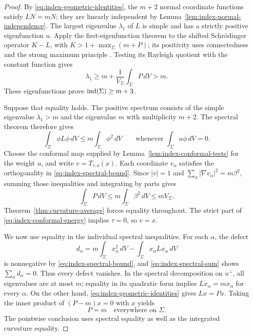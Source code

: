 \begin{proof}
By \eqref{eq:index-geometric-identities}, the $m+2$ normal coordinate
functions satisfy $LN=mN$; they are linearly independent by
Lemma~\ref{lem:index-normal-independence}.  The largest eigenvalue
$\lambda_1$ of $L$ is simple and has a strictly positive eigenfunction
$u$. Apply the first-eigenfunction theorem to the shifted Schr\"odinger
operator $K-L$, with $K>1+\max_\Sigma(m+P)$; its positivity uses
connectedness and the strong maximum principle
\cite[Proposition~2.9]{TaylorSpectralNotes}. Testing its Rayleigh quotient with
the constant function gives
\[
 \lambda_1\ge m+\frac{1}{V_\Sigma}\int_\Sigma P\,dV>m.
\]
These eigenfunctions prove $\operatorname{ind}(\Sigma)\ge m+3$.

Suppose that equality holds.  The positive spectrum consists of the
simple eigenvalue $\lambda_1>m$ and the eigenvalue $m$ with multiplicity
$m+2$.  The spectral theorem therefore gives
\begin{equation}\label{eq:index-spectral-bound}
 \int_\Sigma\phi L\phi\,dV\le m\int_\Sigma\phi^2\,dV
 \qquad\text{whenever }\int_\Sigma u\phi\,dV=0.
\end{equation}
Choose the conformal map supplied by
Lemma~\ref{lem:index-conformal-tests} for the weight $u$, and write
$v=T_{\tau,a}(x)$.  Each coordinate $v_\alpha$ satisfies the
orthogonality in \eqref{eq:index-spectral-bound}.  Since $|v|=1$ and
$\sum_\alpha|\nabla v_\alpha|^2=m\beta^2$, summing those inequalities
and integrating by parts gives
\begin{equation}\label{eq:index-spectral-sum}
 \int_\Sigma P\,dV
       \le m\int_\Sigma\beta^2\,dV\le mV_\Sigma.
\end{equation}
Theorem~\ref{thm:curvature-average} forces equality throughout.  The
strict part of \eqref{eq:index-conformal-energy} implies $\tau=0$, so
$v=x$.

We now use equality in the individual spectral inequalities.  For each
$\alpha$, the defect
\[
 d_\alpha=m\int_\Sigma x_\alpha^2\,dV
                  -\int_\Sigma x_\alpha Lx_\alpha\,dV
\]
is nonnegative by \eqref{eq:index-spectral-bound}, and
\eqref{eq:index-spectral-sum} shows $\sum_\alpha d_\alpha=0$.
Thus every defect vanishes.  In the spectral decomposition on
$u^\perp$, all eigenvalues are at most $m$; equality in its quadratic
form implies $Lx_\alpha=mx_\alpha$ for every $\alpha$.  On the other hand,
\eqref{eq:index-geometric-identities} gives $Lx=Px$.  Taking the inner
product of $(P-m)x=0$ with $x$ yields
\begin{equation}\label{eq:index-pointwise-equality}
 P=m\quad\text{everywhere on }\Sigma.
\end{equation}
The pointwise conclusion uses spectral equality as well as the
integrated curvature equality.


\end{proof}
